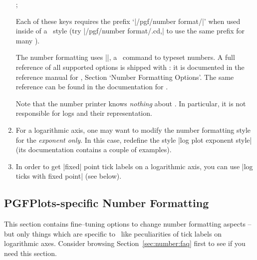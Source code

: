 \begin{enumerate}
\begin{codeexample}[]
;
\end{codeexample}

\begin{codeexample}[]
\end{codeexample}

\begin{codeexample}[]
\end{codeexample}

\begin{codeexample}[]
\end{codeexample}

	\noindent Each of these keys requires the prefix `|/pgf/number format/|' when used inside of a \PGFPlots\ style (try |/pgf/number format/.cd,| to use the same prefix for many ).

	The number formatting uses |\pgfmathprintnumber|, a \pgfname\ command to typeset numbers. A full reference of all supported options is shipped with \PGFPlots: it is documented in the reference manual for \PGFPlotstable, Section `Number Formatting Options'. The same reference can be found in the documentation for \pgfname.

	Note that the number printer knows \emph{nothing} about \PGFPlots. In particular, it is not responsible for logs and their representation.

	\item For a logarithmic axis, one may want to modify the number formatting style for the \emph{exponent only}. In this case, redefine the style |log plot exponent style| (its documentation contains a couple of examples).

	\item In order to get |fixed| point tick labels on a logarithmic axis, you can use |log ticks with fixed point| (see below).
\end{enumerate}


\subsection{PGFPlots-specific Number Formatting}
This section contains fine--tuning options to change number formatting aspects -- but only things which are specific to \PGFPlots\ like peculiarities of tick labels on logarithmic axes. Consider browsing Section~\ref{sec:number:faq} first to see if you need this section.

